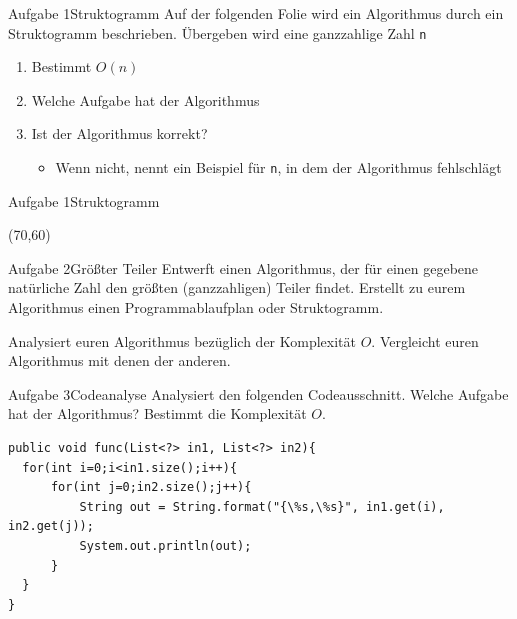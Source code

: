 \begin{frame}{Aufgabe 1}{Struktogramm}
Auf der folgenden Folie wird ein Algorithmus durch ein Struktogramm beschrieben. Übergeben wird eine ganzzahlige Zahl \texttt{n}
\begin{enumerate}
    \item Bestimmt $O(n)$
    \item Welche Aufgabe hat der Algorithmus
    \item Ist der Algorithmus korrekt?
    \begin{itemize}
        \item Wenn nicht, nennt ein Beispiel für \texttt{n}, in dem der Algorithmus fehlschlägt
    \end{itemize}
\end{enumerate}
\end{frame}

\begin{frame}{Aufgabe 1}{Struktogramm}
\begin{centernss}
    \begin{struktogramm}(70,60)
        \untilend
    \end{struktogramm}
\end{centernss}
\end{frame}

\begin{frame}{Aufgabe 2}{Größter Teiler}
Entwerft einen Algorithmus, der für einen gegebene natürliche Zahl den größten (ganzzahligen) Teiler findet. Erstellt zu eurem Algorithmus einen Programmablaufplan oder Struktogramm.

Analysiert euren Algorithmus bezüglich der Komplexität $O$. Vergleicht euren Algorithmus mit denen der anderen.
\end{frame}

\begin{frame}[fragile]{Aufgabe 3}{Codeanalyse}
Analysiert den folgenden Codeausschnitt. Welche Aufgabe hat der Algorithmus? Bestimmt die Komplexität $O$.

\lstset{style=java}
\begin{lstlisting}
public void func(List<?> in1, List<?> in2){
  for(int i=0;i<in1.size();i++){
      for(int j=0;in2.size();j++){
          String out = String.format("{\%s,\%s}", in1.get(i), in2.get(j));
          System.out.println(out);
      }
  }
}
\end{lstlisting}
\end{frame}

